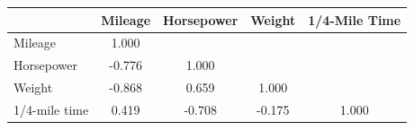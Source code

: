 \begin{tabular}{l*{4}{c}}
\doublerule
&Mileage & Horsepower & Weight & 1/4-Mile Time \\
\midrule
Mileage         &    1.000&&&\\
Horsepower      &   -0.776&    1.000&&\\
Weight          &   -0.868&    0.659&    1.000&\\
1/4-mile time   &    0.419&   -0.708&   -0.175&    1.000\\
\midrule
\end{tabular}
